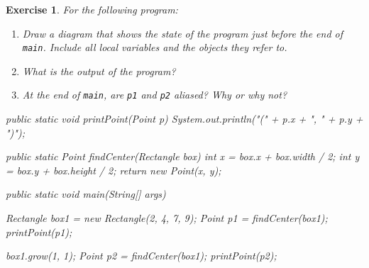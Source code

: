 \documentclass[12pt]{book}
\theoremstyle{exercise}
\newtheorem{exercise}{Exercise}[chapter]
\newcommand{\java}[1]{\verb"#1"}
\newcommand{\java}[1]{\lstinline{#1}} %
\begin{document}
\begin{exercise}
For the following program:

\begin{enumerate}

\item Draw a diagram that shows the state of the program just before the end of \java{main}.
Include all local variables and the objects they refer to.

\item What is the output of the program?

\item At the end of \java{main}, are \java{p1} and \java{p2} aliased?
Why or why not?

\end{enumerate}

\begin{code}
    public static void printPoint(Point p) {
        System.out.println("(" + p.x + ", " + p.y + ")");
    }

    public static Point findCenter(Rectangle box) {
        int x = box.x + box.width / 2;
        int y = box.y + box.height / 2;
        return new Point(x, y);
    }

    public static void main(String[] args) {
        Rectangle box1 = new Rectangle(2, 4, 7, 9);
        Point p1 = findCenter(box1);
        printPoint(p1);

        box1.grow(1, 1);
        Point p2 = findCenter(box1);
        printPoint(p2);
    }
\end{code}

\end{exercise}
\end{document}
